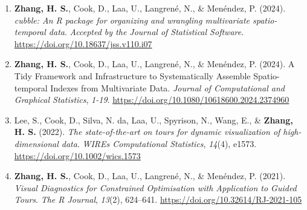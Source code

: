 \documentclass[10pt,a4paper]{article} %
\begin{document}
\vspace{-1em}
\begin{enumerate}[itemsep=0.1em]

    \item \textbf{Zhang, H. S.}, Cook, D., Laa, U., Langren\'e, N., \& Men\'endez, P. (2024). 
    \textit{cubble: An R package for organizing and wrangling multivariate spatio-temporal data}. 
    \emph{Accepted by the Journal of Statistical Software}. \url{https://doi.org/10.18637/jss.v110.i07}

    \item \textbf{Zhang, H. S.}, Cook, D., Laa, U., Langren\'e, N., \& Men\'endez, P. (2024). 
    A Tidy Framework and Infrastructure to Systematically Assemble Spatio-temporal Indexes 
    from Multivariate Data. \emph{Journal of Computational and Graphical Statistics}, 
    \emph{1-19}. \url{https://doi.org/10.1080/10618600.2024.2374960}
    
    \item Lee, S., Cook, D., Silva, N. da, Laa, U., Spyrison, N., Wang, E., \& 
    \textbf{Zhang, H. S.} (2022). \textit{The state-of-the-art on tours for 
    dynamic visualization of high-dimensional data}. \emph{WIREs Computational Statistics}, 
    \emph{14}(4), e1573. \url{https://doi.org/10.1002/wics.1573}
    
    \item \textbf{Zhang, H. S.}, Cook, D., Laa, U., Langren\'e, N., \& Men\'endez, P. (2021). 
    \textit{Visual Diagnostics for Constrained Optimisation with Application to Guided Tours}. 
    \emph{The R Journal}, \emph{13}(2), 624--641. \url{https://doi.org/10.32614/RJ-2021-105}
    

\end{enumerate}


% 
\end{document}
